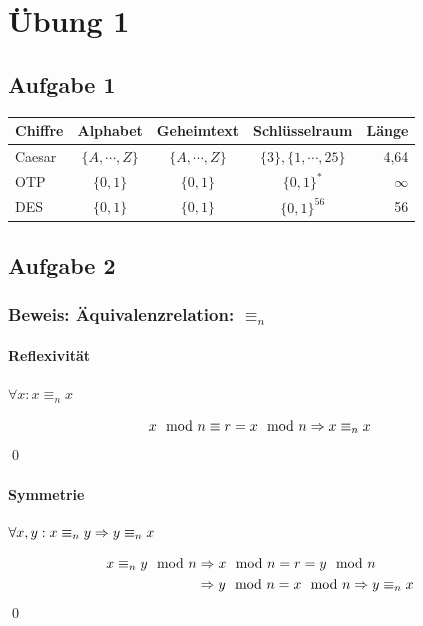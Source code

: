 
\section{Übung 1}

\subsection{Aufgabe 1}

\begin{center}
\begin{tabular}{lcccr}
\textbf{Chiffre} & \textbf{Alphabet} & \textbf{Geheimtext} & \textbf{Schlüsselraum} & \textbf{Länge}                                  \\   \hline
Caesar  & $\{A, \cdots, Z \}$ & $\{A, \cdots, Z \}$ & $\{3\}, \{1, \cdots, 25 \}$ & 4,64     \\   \hline
OTP  	& $\{0,1 \}$  		  & $\{0,1 \}$      	& $\{0,1\}^*$ 				  & $\infty$ \\   \hline
DES  	& $\{0,1 \}$   		  & $\{0,1 \}$ 			& $\{0,1\}^{56}$ 		      & 56       \\   \hline
\end{tabular}
\end{center}
\subsection{Aufgabe 2}
\subsubsection{Beweis: Äquivalenzrelation: $\equiv_n$  }
\paragraph{Reflexivität}
\hspace{1cm} $ \forall x: x \equiv_n x $

\begin{equation}
	x \mod n \equiv r = x \mod n \Rightarrow x \equiv_{n} x 
\end{equation}
\qed

\paragraph{Symmetrie}
\hspace{1cm} $ \forall x,y: x \equiv_n y \Rightarrow y \equiv_n x $

\begin{align*}
	x \equiv_n y \mod n        
	& \Rightarrow 	x \mod n = r = y \mod n      \\ 
	& \Rightarrow	y \mod n = x \mod n        \Rightarrow  y \equiv_n x
\end{align*}
\qed


